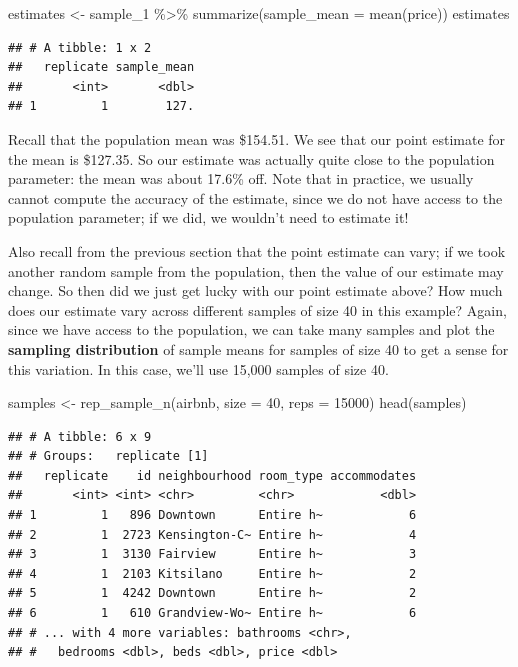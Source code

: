 \documentclass[
]{krantz}
\makeatletter
\newenvironment{Shaded}{\begin{snugshade}}{\end{snugshade}}
\newcommand{\AttributeTok}[1]{\textcolor[rgb]{0.61,0.61,0.61}{#1}}
\newcommand{\DecValTok}[1]{\textcolor[rgb]{0.06,0.06,0.06}{#1}}
\newcommand{\FunctionTok}[1]{\textcolor[rgb]{0,0,0}{#1}}
\newcommand{\NormalTok}[1]{#1}
\newcommand{\OtherTok}[1]{\textcolor[rgb]{0.37,0.37,0.37}{#1}}
\newcommand{\SpecialCharTok}[1]{\textcolor[rgb]{0,0,0}{#1}}
\newenvironment{kframe}{%
\medskip{}
\setlength{\fboxsep}{.8em}
 \def\at@end@of@kframe{}%
 \ifinner\ifhmode%
  \def\at@end@of@kframe{\end{minipage}}%
  \begin{minipage}{\columnwidth}%
 \fi\fi%
 \def\FrameCommand##1{\hskip\@totalleftmargin \hskip-\fboxsep
 \colorbox{shadecolor}{##1}\hskip-\fboxsep
     \hskip-\linewidth \hskip-\@totalleftmargin \hskip\columnwidth}%
 \MakeFramed {\advance\hsize-\width
   \@totalleftmargin\z@ \linewidth\hsize
   \@setminipage}}%
 {\par\unskip\endMakeFramed%
 \at@end@of@kframe}
\renewenvironment{Shaded}{\begin{kframe}}{\end{kframe}}
\makeatother
\begin{document}
\begin{Shaded}
\begin{Highlighting}[]
\NormalTok{estimates }\OtherTok{\textless{}{-}}\NormalTok{ sample\_1 }\SpecialCharTok{\%\textgreater{}\%}
  \FunctionTok{summarize}\NormalTok{(}\AttributeTok{sample\_mean =} \FunctionTok{mean}\NormalTok{(price))}
\NormalTok{estimates}
\end{Highlighting}
\end{Shaded}

\begin{verbatim}
## # A tibble: 1 x 2
##   replicate sample_mean
##       <int>       <dbl>
## 1         1        127.
\end{verbatim}

Recall that the population mean
was \$154.51. We see that our point
estimate for the mean is \$127.35. So our estimate was actually quite close to the population parameter: the mean was
about 17.6\% off.
Note that in practice, we usually cannot compute the accuracy of the estimate, since we do not have access to the population
parameter; if we did, we wouldn't need to estimate it!

Also recall from the previous section that the point estimate can vary; if
we took another random sample from the population, then the value of our estimate may change.
So then did we just get lucky with our point estimate above?
How much does our estimate vary across different samples of size 40 in this example? Again, since we have access to the population,
we can take many samples and plot the \textbf{sampling distribution} of sample means for samples of size 40 to get a sense
for this variation. In this case, we'll use 15,000 samples of size 40.

\begin{Shaded}
\begin{Highlighting}[]
\NormalTok{samples }\OtherTok{\textless{}{-}} \FunctionTok{rep\_sample\_n}\NormalTok{(airbnb, }\AttributeTok{size =} \DecValTok{40}\NormalTok{, }\AttributeTok{reps =} \DecValTok{15000}\NormalTok{)}
\FunctionTok{head}\NormalTok{(samples)}
\end{Highlighting}
\end{Shaded}

\begin{verbatim}
## # A tibble: 6 x 9
## # Groups:   replicate [1]
##   replicate    id neighbourhood room_type accommodates
##       <int> <int> <chr>         <chr>            <dbl>
## 1         1   896 Downtown      Entire h~            6
## 2         1  2723 Kensington-C~ Entire h~            4
## 3         1  3130 Fairview      Entire h~            3
## 4         1  2103 Kitsilano     Entire h~            2
## 5         1  4242 Downtown      Entire h~            2
## 6         1   610 Grandview-Wo~ Entire h~            6
## # ... with 4 more variables: bathrooms <chr>,
## #   bedrooms <dbl>, beds <dbl>, price <dbl>
\end{verbatim}
\end{document}
